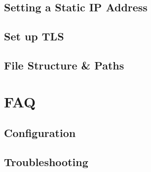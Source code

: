 \documentclass{article}
\begin{document}
\subsection{Setting a Static IP Address} \label{Static IP}

\subsection{Set up TLS} \label{Set up TLS}

\subsection{File Structure \& Paths}



\section{FAQ}
\subsection{Configuration}


\subsection{Troubleshooting}

\end{document}

